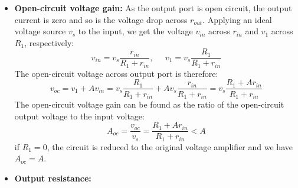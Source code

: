 \documentclass{article}
\begin{document}
\begin{itemize}
\item {\bf Open-circuit voltage gain:} As the output port is open circuit, 
  the output current is zero and so is the voltage drop across $r_{out}$.
  Applying an ideal voltage source $v_s$ to the input, we get the voltage 
  $v_{in}$ across $r_{in}$ and $v_1$ across $R_1$, respectively:
  \begin{equation}
    v_{in}=v_s \frac{r_{in}}{R_1+r_{in}},\;\;\;\;\;
    v_1=v_s \frac{R_1}{R_1+r_{in}} 
  \end{equation}
  The open-circuit voltage across output port is therefore:
  \begin{equation}
    v_{oc}=v_1+A v_{in}=v_s \frac{R_1}{R_1+r_{in}}+Av_s\frac{r_{in}}{R_1+r_{in}}
    =v_s \frac{R_1+A r_{in}}{R_1+r_{in}}  
  \end{equation}
  The open-circuit voltage gain can be found as the ratio of the open-circuit
  output voltage to the input voltage:
  \begin{equation}
    A_{oc}=\frac{v_{oc}}{v_s}=\frac{R_1+A r_{in}}{R_1+r_{in}}<A  
  \end{equation}
  if $R_1=0$, the circuit is reduced to the original voltage amplifier and we
  have $A_{oc}=A$.

\item {\bf Output resistance:} 
  \begin{comment}
  We first find the short-circuit current $i_{sc}$ at the output port. 
  Assume a voltage source $v_s$ with $R_S=0$ is applied to the input 
  port while the output port is short-circuited. Applying KVL to the 
  two loops of the circuit, we get:
  \begin{eqnarray}
    v_s&=&(R_1+r_{in})i_{in}-R_1 i_{sc} 
    \nonumber\\
    A v_{in}&=&A r_{in} i_{in}=(r_{out}+R_1) i_{sc}-R_1 i_{in} 
  \end{eqnarray}
  Solving these two equations for the two unknowns $i_{in}$ and $i_{sc}$, 
  we get
  \begin{equation}
    i_{sc}=v_s \frac{Ar_{in}+R_1}{(1-A)R_1 r_{in} +r_{out}(r_{in}+R_1)}
  \end{equation}
  The open-circuit output voltage $v_{oc}$ is 
  \begin{equation}
    v_{oc}=Ar_{in}i_{in}+R_1i_{in}=(Ar_{in}+R_1)\frac{v_s}{r_{in}+R_1} 
  \end{equation}
  Now the output resistance can be found to be:
  \begin{eqnarray}
    R_{out}&=&\frac{v_{oc}}{i_{sc}}
    =\frac{(1-A)r_{in}R_1+r_{out}(r_{in}+R_1)}{r_{in}+R_1}
    \nonumber\\
    &=&r_{out}-\frac{(A-1) r_{in}R_1}{R_1+r_{in}}
    \approx r_{out}-A\;r_{in}||R_1<r_{out}
  \end{eqnarray}
  i.e., the output resistance is much reduced. Moreover, when $R_1=0$, 
  $R_{out}=r_{out}$.
  \end{comment}


\end{itemize}
\end{document}
